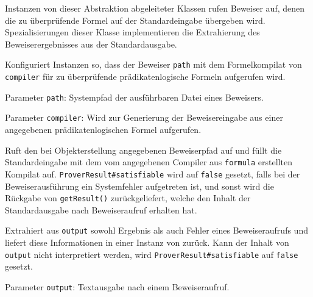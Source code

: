Instanzen von dieser Abstraktion abgeleiteter Klassen rufen Beweiser
auf, denen die zu überprüfende Formel auf der Standardeingabe
übergeben wird. Spezialisierungen dieser Klasse implementieren die
Extrahierung des Beweiserergebnisses aus der Standardausgabe.%


\begin{description}%


\end{description}%


\begin{description}%

    Konfiguriert Instanzen so, dass der Beweiser \texttt{path} mit dem
    Formelkompilat von \texttt{compiler} für zu überprüfende
    prädikatenlogische Formeln aufgerufen wird.%

    Parameter \texttt{path}: Systempfad der ausführbaren Datei eines
    Beweisers.%

    Parameter \texttt{compiler}: Wird zur Generierung der
    Beweisereingabe aus einer angegebenen prädikatenlogischen Formel
    aufgerufen.%


    Ruft den bei Objekterstellung angegebenen Beweiserpfad auf und
    füllt die Standardeingabe mit dem vom angegebenen Compiler aus
    \texttt{formula} erstellten Kompilat auf.
    \texttt{ProverResult\#satisfiable} wird auf \texttt{false}
    gesetzt, falls bei der Beweiserausführung ein Systemfehler
    aufgetreten ist, und sonst wird die Rückgabe von
    \texttt{getResult()} zurückgeliefert, welche den Inhalt der
    Standardausgabe nach Beweiseraufruf erhalten hat.%


    Extrahiert aus \texttt{output} sowohl Ergebnis als auch Fehler
    eines Beweiseraufrufs und liefert diese Informationen in einer
    Instanz von  zurück. Kann der Inhalt von
    \texttt{output} nicht interpretiert werden, wird
    \texttt{ProverResult\#satisfiable} auf \texttt{false} gesetzt.%

    Parameter \texttt{output}: Textausgabe nach einem Beweiseraufruf.%

\end{description}%

